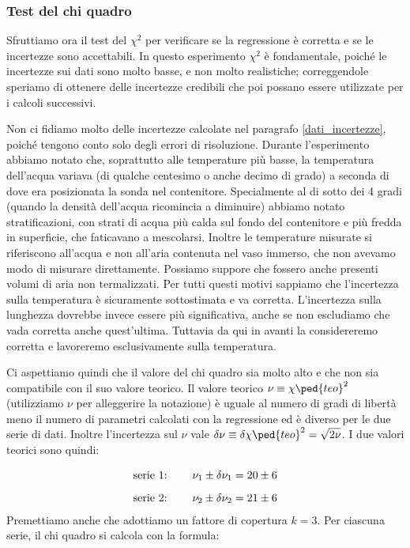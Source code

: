 \subsubsection{Test del chi quadro}
\label{chi_1}

Sfruttiamo ora il test del $\chi^2$ per verificare se la regressione è corretta e se le incertezze sono accettabili.
In questo esperimento $\chi^2$ è fondamentale, poiché le incertezze sui dati sono molto basse, e non molto realistiche;
correggendole speriamo di ottenere delle incertezze credibili che poi possano essere utilizzate per i calcoli successivi.

Non ci fidiamo molto delle incertezze calcolate nel paragrafo \ref{dati_incertezze}, poiché tengono conto solo degli errori
di risoluzione. Durante l'esperimento abbiamo notato che, soprattutto alle temperature più basse, la temperatura dell'acqua
variava (di qualche centesimo o anche decimo di grado) a seconda di dove era posizionata la sonda nel contenitore. Specialmente
al di sotto dei 4 gradi (quando la densità dell'acqua ricomincia a diminuire) abbiamo notato stratificazioni, con strati di acqua
più calda sul fondo del contenitore e più fredda in superficie, che faticavano a mescolarsi. Inoltre le temperature misurate
si riferiscono all'acqua e non all'aria contenuta nel vaso immerso, che non avevamo modo di misurare direttamente. Possiamo suppore che fossero anche presenti volumi di aria non termalizzati. Per tutti questi motivi sappiamo che l'incertezza sulla temperatura è sicuramente sottostimata e va corretta. L'incertezza sulla lunghezza dovrebbe invece essere più significativa, anche se non escludiamo che vada corretta anche quest'ultima. Tuttavia da qui in avanti la considereremo corretta e lavoreremo esclusivamente sulla temperatura.

Ci aspettiamo quindi che il valore del chi quadro sia molto alto e che non sia compatibile con il suo valore teorico. Il valore teorico
$\nu \equiv \chi\ped{teo}^2$ (utilizziamo $\nu$ per alleggerire la notazione) è uguale al numero di gradi di libertà meno
il numero di parametri calcolati con la regressione ed è diverso per le due serie di dati. Inoltre l'incertezza sul
$\nu$ vale $\delta \nu \equiv \delta \chi\ped{teo}^2 = \sqrt{2\nu}$. I due valori teorici sono quindi:

\begin{equation}
    \begin{array}{l @{\hspace{0.8cm}} c}
        \text{serie 1:} & \nu_1 \pm \delta \nu_1 = 20 \pm 6 \\[3mm]
        \text{serie 2:} & \nu_2 \pm \delta \nu_2 = 21 \pm 6
    \end{array}
\end{equation}
%
Premettiamo anche che adottiamo un fattore di copertura $k = 3$.
Per ciascuna serie, il chi quadro si calcola con la formula:

